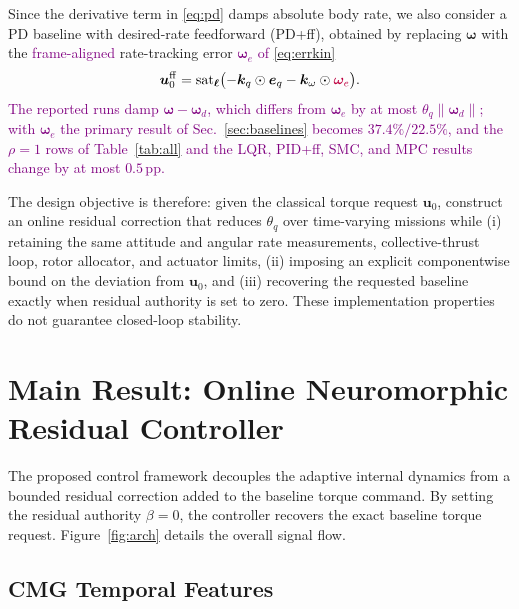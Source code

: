 \documentclass[letterpaper, 10 pt, conference]{ieeeconf}
\newcommand{\sat}{\operatorname{sat}}
\begin{document}
Since the derivative term in \eqref{eq:pd} damps absolute body rate,
we also consider a PD baseline with desired-rate feedforward (PD+ff),
obtained by replacing $\bm\omega$ with the \textcolor{purple}{frame-aligned} rate-tracking error \textcolor{purple}{$\bm\omega_e$ of \eqref{eq:errkin}}
\begin{equation}
 \bm u_0^{\rm ff}=\sat_{\bm\ell}\bigl(-\bm k_q\odot\bm e_q-\bm k_\omega\odot\textcolor{purple}{\bm\omega_e}\bigr).
 \label{eq:pdff}
\end{equation}
\textcolor{purple}{The reported runs damp $\bm\omega-\bm\omega_d$, which differs from $\bm\omega_e$ by at most $\theta_q\|\bm\omega_d\|$; with $\bm\omega_e$ the primary result of Sec.~\ref{sec:baselines} becomes $37.4\%/22.5\%$, and the $\rho=1$ rows of Table~\ref{tab:all} and the LQR, PID+ff, SMC, and MPC results change by at most $0.5$\,pp.}

The design objective is therefore: given the classical torque request $\bm u_0$, construct an online residual correction that reduces $\theta_q$ over time-varying missions while (i) retaining the same attitude and angular rate measurements, collective-thrust loop, rotor allocator, and actuator limits, (ii) imposing an explicit componentwise bound on the deviation from $\bm u_0$, and (iii) recovering the requested baseline exactly when residual authority is set to zero. These implementation properties do not guarantee closed-loop stability.


\section{Main Result: Online Neuromorphic Residual Controller}
\label{sec:main}
The proposed control framework decouples the adaptive internal dynamics from a bounded residual correction added to the baseline torque command. By setting the residual authority $\beta = 0$, the controller recovers the exact baseline torque request. Figure~\ref{fig:arch} details the overall signal flow.


\subsection{CMG Temporal Features}
\end{document}
